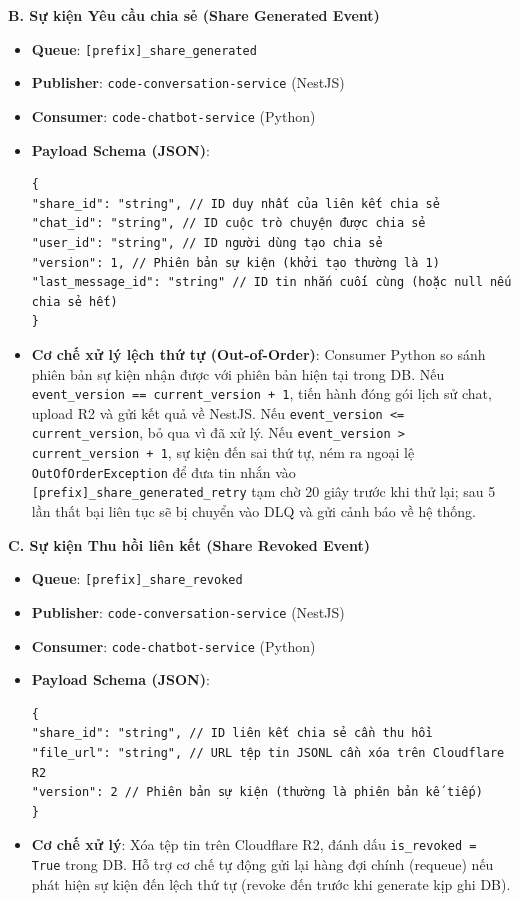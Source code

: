 \textbf{B. Sự kiện Yêu cầu chia sẻ (Share Generated Event)}
\begin{itemize}
\item \textbf{Queue}: \texttt{[prefix]\_share\_generated}
\item \textbf{Publisher}: \texttt{code-conversation-service} (NestJS)
\item \textbf{Consumer}: \texttt{code-chatbot-service} (Python)
\item \textbf{Payload Schema (JSON)}:
\begin{verbatim}
{
"share_id": "string", // ID duy nhất của liên kết chia sẻ
"chat_id": "string", // ID cuộc trò chuyện được chia sẻ
"user_id": "string", // ID người dùng tạo chia sẻ
"version": 1, // Phiên bản sự kiện (khởi tạo thường là 1)
"last_message_id": "string" // ID tin nhắn cuối cùng (hoặc null nếu chia sẻ hết)
}
\end{verbatim}
\item \textbf{Cơ chế xử lý lệch thứ tự (Out-of-Order)}: Consumer Python so sánh phiên bản sự kiện nhận được với phiên bản hiện tại trong DB. Nếu \texttt{event\_version == current\_version + 1}, tiến hành đóng gói lịch sử chat, upload R2 và gửi kết quả về NestJS. Nếu \texttt{event\_version <= current\_version}, bỏ qua vì đã xử lý. Nếu \texttt{event\_version > current\_version + 1}, sự kiện đến sai thứ tự, ném ra ngoại lệ \texttt{OutOfOrderException} để đưa tin nhắn vào \texttt{[prefix]\_share\_generated\_retry} tạm chờ 20 giây trước khi thử lại; sau 5 lần thất bại liên tục sẽ bị chuyển vào DLQ và gửi cảnh báo về hệ thống.
\end{itemize}

\textbf{C. Sự kiện Thu hồi liên kết (Share Revoked Event)}
\begin{itemize}
\item \textbf{Queue}: \texttt{[prefix]\_share\_revoked}
\item \textbf{Publisher}: \texttt{code-conversation-service} (NestJS)
\item \textbf{Consumer}: \texttt{code-chatbot-service} (Python)
\item \textbf{Payload Schema (JSON)}:
\begin{verbatim}
{
"share_id": "string", // ID liên kết chia sẻ cần thu hồi
"file_url": "string", // URL tệp tin JSONL cần xóa trên Cloudflare R2
"version": 2 // Phiên bản sự kiện (thường là phiên bản kế tiếp)
}
\end{verbatim}
\item \textbf{Cơ chế xử lý}: Xóa tệp tin trên Cloudflare R2, đánh dấu \texttt{is\_revoked = True} trong DB. Hỗ trợ cơ chế tự động gửi lại hàng đợi chính (requeue) nếu phát hiện sự kiện đến lệch thứ tự (revoke đến trước khi generate kịp ghi DB).
\end{itemize}

